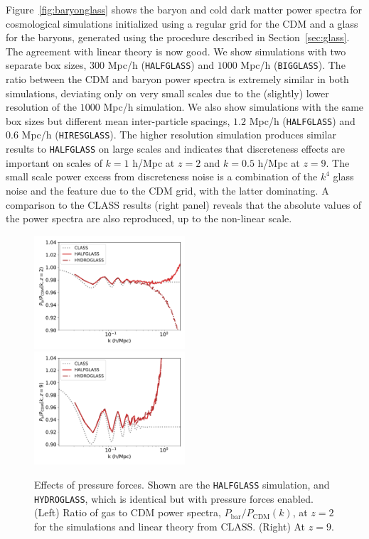 \documentclass[a4paper,11pt]{article}
\begin{document}
Figure~\ref{fig:baryonglass} shows the baryon and cold dark matter power spectra for cosmological simulations initialized using a regular grid for the CDM and a glass for the baryons, generated using the procedure described in Section~\ref{sec:glass}. The agreement with linear theory is now good. We show simulations with two separate box sizes, $300$ Mpc/h (\texttt{HALFGLASS}) and $1000$ Mpc/h (\texttt{BIGGLASS}). The ratio between the CDM and baryon power spectra is extremely similar in both simulations, deviating only on very small scales due to the (slightly) lower resolution of the $1000$ Mpc/h simulation.
We also show simulations with the same box sizes but different mean inter-particle spacings, $1.2$ Mpc/h (\texttt{HALFGLASS}) and $0.6$ Mpc/h (\texttt{HIRESGLASS}). The higher resolution simulation produces similar results to \texttt{HALFGLASS} on large scales and indicates that discreteness effects are important on scales of $k=1$ h/Mpc at $z=2$ and $k=0.5$ h/Mpc at $z=9$. The small scale power excess from discreteness noise is a combination of the $k^4$ glass noise and the feature due to the CDM grid, with the latter dominating. A comparison to the CLASS results (right panel) reveals that the absolute values of the power spectra are also reproduced, up to the non-linear scale.

\begin{figure}
\includegraphics[width=0.5\textwidth]{plots/hydro_2_relpower.pdf}
\includegraphics[width=0.5\textwidth]{plots/hydro_9_relpower.pdf}
\caption{Effects of pressure forces. Shown are the \texttt{HALFGLASS} simulation, and \texttt{HYDROGLASS}, which is identical but with pressure forces enabled. (Left) Ratio of gas to CDM power spectra, $P_\mathrm{bar}/P_\mathrm{CDM}(k)$, at $z=2$ for the simulations and linear theory from CLASS. (Right) At $z=9$.}
  \label{fig:hydro}
\end{figure}
\end{document}
